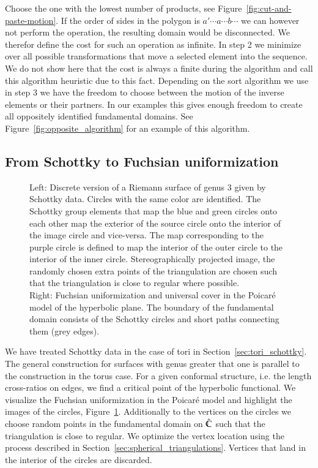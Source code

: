 \documentclass[Thesis]{subfiles}
\begin{document}
Choose the one with the lowest number of products, see Figure~\ref{fig:cut-and-paste-motion}. If the order of sides in the polygon is $a' \cdots a \cdots b \cdots$ we can however not perform the operation, the resulting domain would be disconnected. We therefor define the cost for such an operation as infinite. In step 2 we minimize over all possible transformations that move a selected element into the sequence. We do not show here that the cost is always a finite during the algorithm and call this algorithm heuristic due to this fact. Depending on the sort algorithm we use in step 3 we have the freedom to choose between the motion of the inverse elements or their partners. In our examples this gives enough freedom to create all oppositely identified fundamental domains. See Figure~\ref{fig:opposite_algorithm} for an example of this algorithm.


\subsection{From Schottky to Fuchsian uniformization}
\label{sec:schottky}

\begin{figure}
\centering
{}
\caption{
Left: Discrete version of a Riemann surface of genus $3$ given by Schottky data.
Circles with the same color are identified.
The Schottky group elements that map the blue and green circles onto each other map the exterior of the source circle onto the interior of the image circle and vice-versa.
The map corresponding to the purple circle is defined to map the interior of the outer circle to the interior of the inner circle. Stereographically projected image, the randomly chosen extra points of the triangulation are chosen such that the triangulation is close to regular where possible.
\\
Right: Fuchsian uniformization and universal cover in the Poicar\'e model of the hyperbolic plane. The boundary of the fundamental domain consists of  the Schottky circles and short paths connecting them (grey edges).
}
\label{fig:schottky_g3}
\end{figure}

We have treated Schottky data in the case of tori in Section~\ref{sec:tori_schottky}.
The general construction for surfaces with genus greater that one is parallel to the construction in the torus case.
For a given conformal structure, i.e. the length cross-ratios on edges, we find a critical point of the hyperbolic functional.
We visualize the Fuchsian uniformization in the Poicar\'{e} model and highlight the images of the circles, Figure~\ref{fig:schottky_g3}.
Additionally to the vertices on the circles we choose random points in the fundamental domain on $\hat{\mathbb C}$ such that the triangulation is close to regular.
We optimize the vertex location using the process described in Section~\ref{sec:spherical_triangulations}.
Vertices that land in the interior of the circles are discarded.
\end{document}
